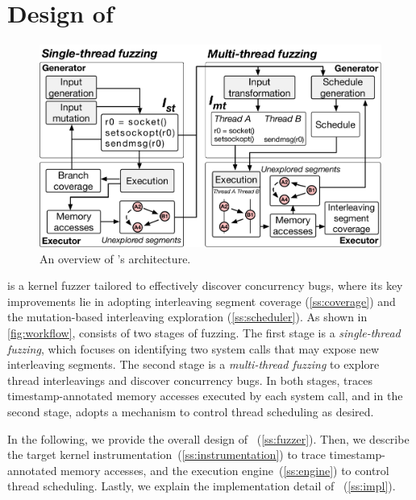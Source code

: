 \section{Design of \sys}
\label{s:impl}

\begin{figure}
  \centering
  \includegraphics[width=0.95\linewidth]{fig/architecture.pdf}
  \caption{An overview of \sys's architecture. \dr{}}
  \label{fig:workflow}
  \vspace{-5pt}
\end{figure}

\sys is a kernel fuzzer tailored to effectively discover concurrency
bugs, where its key improvements lie in adopting interleaving segment
coverage (\autoref{ss:coverage}) and the mutation-based interleaving
exploration (\autoref{ss:scheduler}).
%
As shown in \autoref{fig:workflow}, \sys consists of two stages of
fuzzing.
%
The first stage is a \textit{single-thread fuzzing}, which focuses on
identifying two system calls that may expose new interleaving
segments.
%
The second stage is a \textit{multi-thread fuzzing} to explore thread
interleavings and discover concurrency bugs.
%
In both stages, \sys traces timestamp-annotated memory accesses
executed by each system call, and in the second stage, \sys adopts a
mechanism to control thread scheduling as desired.



In the following, we provide the overall design of
\sys~(\autoref{ss:fuzzer}).
%
Then, we describe the target kernel
instrumentation~(\autoref{ss:instrumentation}) to trace
timestamp-annotated memory accesses, and the execution
engine~(\autoref{ss:engine}) to control thread scheduling.
%
Lastly, we explain the implementation detail of
\sys~(\autoref{ss:impl}).




